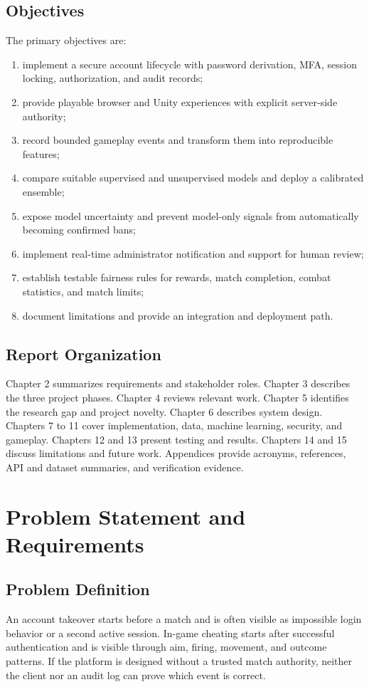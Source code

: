 \documentclass[12pt,a4paper,oneside]{report}
\begin{document}
\section{Objectives}
The primary objectives are:
\begin{enumerate}[leftmargin=18mm]
\item implement a secure account lifecycle with password derivation, MFA, session locking, authorization, and audit records;
\item provide playable browser and Unity experiences with explicit server-side authority;
\item record bounded gameplay events and transform them into reproducible features;
\item compare suitable supervised and unsupervised models and deploy a calibrated ensemble;
\item expose model uncertainty and prevent model-only signals from automatically becoming confirmed bans;
\item implement real-time administrator notification and support for human review;
\item establish testable fairness rules for rewards, match completion, combat statistics, and match limits;
\item document limitations and provide an integration and deployment path.
\end{enumerate}

\section{Report Organization}
Chapter 2 summarizes requirements and stakeholder roles. Chapter 3 describes the three project phases. Chapter 4 reviews relevant work. Chapter 5 identifies the research gap and project novelty. Chapter 6 describes system design. Chapters 7 to 11 cover implementation, data, machine learning, security, and gameplay. Chapters 12 and 13 present testing and results. Chapters 14 and 15 discuss limitations and future work. Appendices provide acronyms, references, API and dataset summaries, and verification evidence.

\chapter{Problem Statement and Requirements}
\section{Problem Definition}
An account takeover starts before a match and is often visible as impossible login behavior or a second active session. In-game cheating starts after successful authentication and is visible through aim, firing, movement, and outcome patterns. If the platform is designed without a trusted match authority, neither the client nor an audit log can prove which event is correct.
\end{document}
